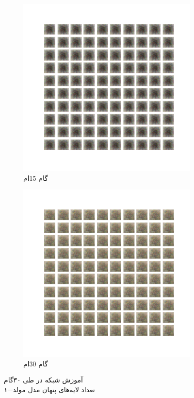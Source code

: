 \documentclass[12pt, a4paper]{book}
\begin{document}
\begin{figure}[h]
\begin{subfigure}{0.3\linewidth}
        \includegraphics[width=\linewidth]{images/fcgan/nlayer1/generated_img_15.png}
        \caption{گام 15ام}
    \end{subfigure}
    \begin{subfigure}{0.3\linewidth}
        \includegraphics[width=\linewidth]{images/fcgan/nlayer1/generated_img_30.png}
        \caption{گام 30ام}
    \end{subfigure}
    \caption{آموزش شبکه  در طی ۳۰گام\\ تعداد لایه‌های پنهان مدل مولد=۱}
    \label{fcgan_nlayer1}
\end{figure}
\end{document}

